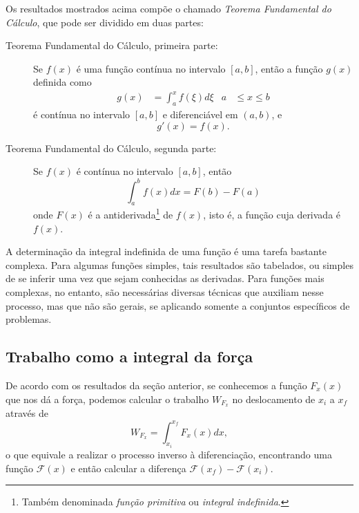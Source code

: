 Os resultados mostrados acima compõe o chamado \emph{Teorema Fundamental do Cálculo}, que pode ser dividido em duas partes:
\begin{description}
  \item[Teorema Fundamental do Cálculo, primeira parte:] Se $f(x)$ é uma função contínua no intervalo $[a,b]$, então a função $g(x)$ definida como
  \begin{align}
    g(x) &= \int_a^x f(\xi) d\xi & a&\leq x \leq b
  \end{align}
  é contínua no intervalo $[a,b]$ e diferenciável em $(a,b)$, e
  \begin{equation}
    g'(x) = f(x).
  \end{equation}
  \item[Teorema Fundamental do Cálculo, segunda parte:] Se $f(x)$ é contínua no intervalo $[a,b]$, então
  \begin{equation}
    \int_a^b f(x) dx = F(b) - F(a)
  \end{equation}
  onde $F(x)$ é a antiderivada\footnote{Também denominada \emph{função primitiva} ou \emph{integral indefinida}.} de $f(x)$, isto é, a função cuja derivada é $f(x)$.
\end{description}

A determinação da integral indefinida de uma função é uma tarefa bastante complexa. Para algumas funções simples, tais resultados são tabelados, ou simples de se inferir uma vez que sejam conhecidas as derivadas. Para funções mais complexas, no entanto, são necessárias diversas técnicas que auxiliam nesse processo, mas que não são gerais, se aplicando somente a conjuntos específicos de problemas.

\subsection{Trabalho como a integral da força}

De acordo com os resultados da seção anterior, se conhecemos a função $F_x(x)$ que nos dá a força, podemos calcular o trabalho $W_{F_x}$ no deslocamento de $x_i$ a $x_f$através de
\begin{equation}
    W_{F_x} = \int_{x_i}^{x_f} F_x(x) dx,
\end{equation}
%
o que equivale a realizar o processo inverso à diferenciação, encontrando uma função $\mathcal{F}(x)$ e então calcular a diferença $\mathcal{F}(x_f) - \mathcal{F}(x_i)$. 

